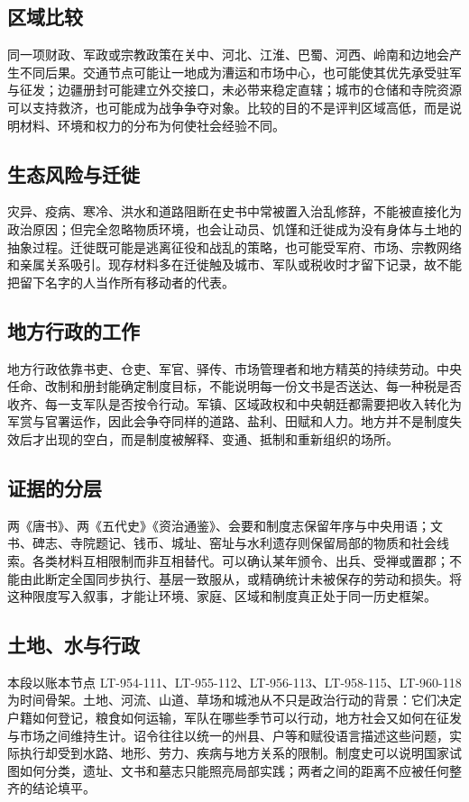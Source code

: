 \subsection{区域比较}
同一项财政、军政或宗教政策在关中、河北、江淮、巴蜀、河西、岭南和边地会产生不同后果。交通节点可能让一地成为漕运和市场中心，也可能使其优先承受驻军与征发；边疆册封可能建立外交接口，未必带来稳定直辖；城市的仓储和寺院资源可以支持救济，也可能成为战争争夺对象。比较的目的不是评判区域高低，而是说明材料、环境和权力的分布为何使社会经验不同。

\subsection{生态风险与迁徙}
灾异、疫病、寒冷、洪水和道路阻断在史书中常被置入治乱修辞，不能被直接化为政治原因；但完全忽略物质环境，也会让动员、饥馑和迁徙成为没有身体与土地的抽象过程。迁徙既可能是逃离征役和战乱的策略，也可能受军府、市场、宗教网络和亲属关系吸引。现存材料多在迁徙触及城市、军队或税收时才留下记录，故不能把留下名字的人当作所有移动者的代表。

\subsection{地方行政的工作}
地方行政依靠书吏、仓吏、军官、驿传、市场管理者和地方精英的持续劳动。中央任命、改制和册封能确定制度目标，不能说明每一份文书是否送达、每一种税是否收齐、每一支军队是否按令行动。军镇、区域政权和中央朝廷都需要把收入转化为军赏与官署运作，因此会争夺同样的道路、盐利、田赋和人力。地方并不是制度失效后才出现的空白，而是制度被解释、变通、抵制和重新组织的场所。

\subsection{证据的分层}
两《唐书》、两《五代史》《资治通鉴》、会要和制度志保留年序与中央用语；文书、碑志、寺院题记、钱币、城址、窑址与水利遗存则保留局部的物质和社会线索。各类材料互相限制而非互相替代。可以确认某年颁令、出兵、受禅或置郡；不能由此断定全国同步执行、基层一致服从，或精确统计未被保存的劳动和损失。将这种限度写入叙事，才能让环境、家庭、区域和制度真正处于同一历史框架。
\subsection{土地、水与行政}
本段以账本节点 LT-954-111、LT-955-112、LT-956-113、LT-958-115、LT-960-118 为时间骨架。土地、河流、山道、草场和城池从不只是政治行动的背景：它们决定户籍如何登记，粮食如何运输，军队在哪些季节可以行动，地方社会又如何在征发与市场之间维持生计。诏令往往以统一的州县、户等和赋役语言描述这些问题，实际执行却受到水路、地形、劳力、疾病与地方关系的限制。制度史可以说明国家试图如何分类，遗址、文书和墓志只能照亮局部实践；两者之间的距离不应被任何整齐的结论填平。

